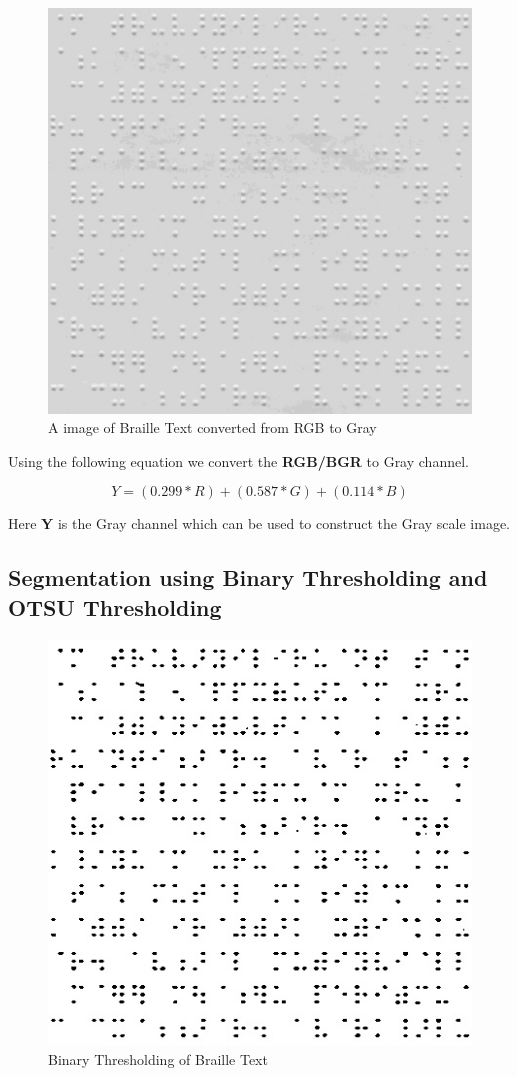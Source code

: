 \documentclass{article}
\begin{document}
\begin{figure}[!htb]
\caption{A image of Braille Text converted from RGB to Gray}
\centering
\includegraphics[scale=0.4]{gray}
\end{figure}



Using the following equation we convert the \textbf{RGB/BGR} to Gray channel.

\begin{equation}
	Y = (0.299*R) + (0.587*G) + (0.114*B)
\end{equation}

Here \textbf{Y} is the Gray channel which can be used to construct the Gray scale image.

\subsection{Segmentation using Binary Thresholding and OTSU Thresholding}

\begin{figure}[!htb]
\caption{Binary Thresholding of Braille Text}
\centering
\includegraphics[scale=0.4]{binthresh}
\end{figure}
\end{document}
